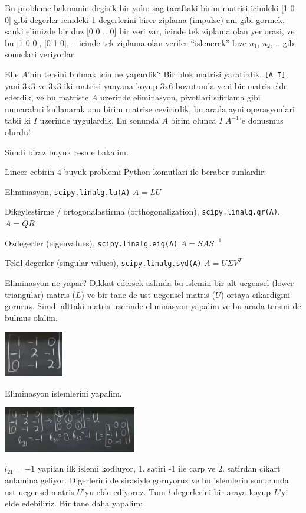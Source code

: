 \documentclass[12pt,fleqn]{article}
\begin{document}
Bu probleme bakmanin degisik bir yolu: sag taraftaki birim matrisi icindeki
[1 0 0] gibi degerler icindeki 1 degerlerini birer ziplama (impulse) ani
gibi gormek, sanki elimizde bir duz [0 0 .. 0] bir veri var, icinde tek
ziplama olan yer orasi, ve bu [1 0 0], [0 1 0], .. icinde tek ziplama olan
veriler ``islenerek'' bize $u_1$, $u_2$, .. gibi sonuclari veriyorlar. 

Elle $A$'nin tersini bulmak icin ne yapardik? Bir blok matrisi yaratirdik,
\verb![A I]!, yani 3x3 ve 3x3 iki matrisi yanyana koyup 3x6 boyutunda yeni
bir matris elde ederdik, ve bu matriste $A$ uzerinde eliminasyon, pivotlari
sifirlama gibi numaralari kullanarak onu birim matrise cevirirdik, bu arada
ayni operasyonlari tabii ki $I$ uzerinde uygulardik. En sonunda $A$ birim
olunca $I$ $A^{-1}$'e donusmus olurdu!

Simdi biraz buyuk resme bakalim. 

Lineer cebirin 4 buyuk problemi Python komutlari ile beraber sunlardir:

Eliminasyon, 
\verb!scipy.linalg.lu(A)! $A = LU$

Dikeylestirme / ortogonalastirma (orthogonalization), 
\verb!scipy.linalg.qr(A)!, $A = QR$

Ozdegerler (eigenvalues), 
\verb!scipy.linalg.eig(A)! $A = SAS^{-1}$

Tekil degerler (singular values), 
\verb!scipy.linalg.svd(A)! $A = U \Sigma V^{T}$

Eliminasyon ne yapar? Dikkat edersek aslinda bu islemin bir alt ucgensel
(lower triangular) matris ($L$) ve bir tane de ust ucgensel matris ($U$)
ortaya cikardigini goruruz. Simdi alttaki matris uzerinde eliminasyon
yapalim ve bu arada tersini de bulmus olalim. 

\includegraphics[height=2cm]{3_2.png}

Eliminasyon islemlerini yapalim. 

\includegraphics[height=2cm]{3_3.png}

$l_{21} = -1$ yapilan ilk islemi kodluyor, 1. satiri -1 ile carp ve
2. satirdan cikart anlamina geliyor. Digerlerini de sirasiyle goruyoruz ve
bu islemlerin sonucunda ust ucgensel matris $U$'yu elde ediyoruz. Tum $l$
degerlerini bir araya koyup $L$'yi elde edebiliriz. Bir tane daha yapalim:
\end{document}
